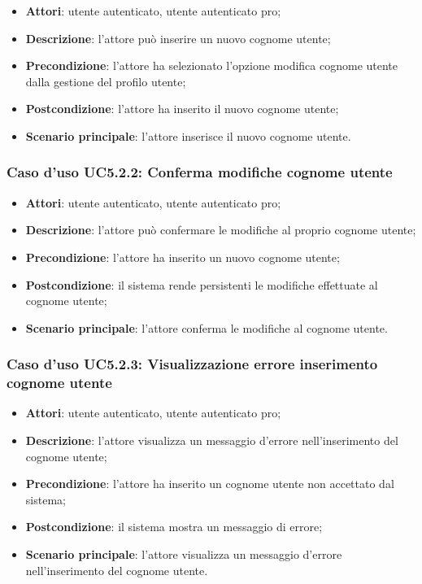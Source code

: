 \begin{itemize}
	\item \textbf{Attori}: utente autenticato, utente autenticato pro;
	\item \textbf{Descrizione}: l'attore può inserire un nuovo cognome utente;
	\item \textbf{Precondizione}:  l'attore ha selezionato l'opzione modifica cognome utente dalla gestione del profilo utente; 
	\item \textbf{Postcondizione}:  l'attore ha inserito il nuovo cognome utente;
	\item \textbf{Scenario principale}: l'attore inserisce il nuovo cognome utente.
\end{itemize}

\subsubsection{Caso d'uso UC5.2.2: Conferma modifiche cognome utente}

\begin{itemize}
	\item \textbf{Attori}: utente autenticato, utente autenticato pro;
	\item \textbf{Descrizione}: l'attore può confermare le modifiche al proprio cognome utente;
	\item \textbf{Precondizione}: l'attore ha inserito un nuovo cognome utente;
	\item \textbf{Postcondizione}: il sistema rende persistenti le modifiche effettuate al cognome utente;
	\item \textbf{Scenario principale}: l'attore conferma le modifiche al cognome utente.
\end{itemize}

\subsubsection{Caso d'uso UC5.2.3: Visualizzazione errore inserimento cognome utente}
\begin{itemize}
	\item \textbf{Attori}: utente autenticato, utente autenticato pro;
	\item \textbf{Descrizione}: l'attore visualizza un messaggio d'errore nell'inserimento del cognome utente;
	\item \textbf{Precondizione}: l'attore ha inserito un cognome utente non accettato dal sistema;
	\item \textbf{Postcondizione}: il sistema mostra un messaggio di errore;
	\item \textbf{Scenario principale}: l'attore visualizza un messaggio d'errore nell'inserimento del cognome utente.
\end{itemize}

